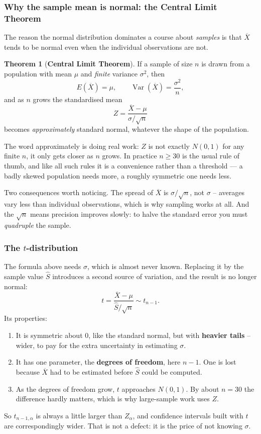 \documentclass[11pt,a4paper]{article}
\theoremstyle{definition}
\newtheorem{thm}{Theorem}[section]
\begin{document}
\subsubsection{Why the sample mean is normal: the Central Limit Theorem}

The reason the normal distribution dominates a course about \emph{samples} is that
$\overline{X}$ tends to be normal even when the individual observations are not.

\begin{thm}[\textbf{Central Limit Theorem}]
If a sample of size $n$ is drawn from a population with mean $\mu$ and \emph{finite}
variance $\sigma^2$, then
\[E(\overline{X})=\mu,\qquad \operatorname{Var}(\overline{X})=\frac{\sigma^2}{n},\]
and as $n$ grows the standardised mean
\[Z=\frac{\overline{X}-\mu}{\sigma/\sqrt{n}}\]
becomes \emph{approximately} standard normal, whatever the shape of the population.
\end{thm}

The word approximately is doing real work: $Z$ is not exactly $N(0,1)$ for any finite $n$,
it only gets closer as $n$ grows. In practice $n\geq 30$ is the usual rule of thumb, and
like all such rules it is a convenience rather than a threshold --- a badly skewed
population needs more, a roughly symmetric one needs less.

Two consequences worth noticing. The spread of $\overline{X}$ is $\sigma/\sqrt{n}$, not
$\sigma$ -- averages vary less than individual observations, which is why sampling works at
all. And the $\sqrt{n}$ means precision improves slowly: to halve the standard error you
must \emph{quadruple} the sample.

\subsubsection{The $t$-distribution}

The formula above needs $\sigma$, which is almost never known. Replacing it by the sample
value $\hat{S}$ introduces a second source of variation, and the result is no longer
normal:
\[t=\frac{\overline{X}-\mu}{\hat{S}/\sqrt{n}} \sim t_{n-1}.\]
Its properties:
\begin{enumerate}
\item It is symmetric about 0, like the standard normal, but with \textbf{heavier tails} --
wider, to pay for the extra uncertainty in estimating $\sigma$.
\item It has one parameter, the \textbf{degrees of freedom}, here $n-1$. One is lost
because $\overline{X}$ had to be estimated before $\hat{S}$ could be computed.
\item As the degrees of freedom grow, $t$ approaches $N(0,1)$. By about $n=30$ the
difference hardly matters, which is why large-sample work uses $Z$.
\end{enumerate}
So $t_{n-1,\alpha}$ is always a little larger than $Z_{\alpha}$, and confidence intervals
built with $t$ are correspondingly wider. That is not a defect: it is the price of not
knowing $\sigma$.
\end{document}
